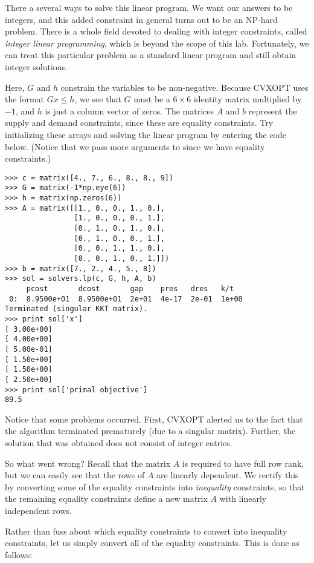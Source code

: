 There a several ways to solve this linear program. We want our answers to be integers, and this added constraint in general turns out to be an NP-hard problem.
There is a whole field devoted to dealing with integer constraints, called \emph{integer linear programming}, which is beyond the scope of this lab.
Fortunately, we can treat this particular problem as a standard linear program and still obtain integer solutions.

Here, $G$ and $h$ constrain the variables to be non-negative.
Because CVXOPT uses the format $Gx \leq h$, we see that $G$ must be a $6 \times 6$ identity matrix multiplied by $-1$, and
$h$ is just a column vector of zeros.
The matrices $A$ and $b$ represent the supply and demand constraints, since these are equality constraints.
Try initializing these arrays and solving the linear program by entering the code below. (Notice that
we pass more arguments to  since we have equality constraints.)
\begin{lstlisting}
>>> c = matrix([4., 7., 6., 8., 8., 9])
>>> G = matrix(-1*np.eye(6))
>>> h = matrix(np.zeros(6))
>>> A = matrix([[1., 0., 0., 1., 0.],
                [1., 0., 0., 0., 1.],
                [0., 1., 0., 1., 0.],
                [0., 1., 0., 0., 1.],
                [0., 0., 1., 1., 0.],
                [0., 0., 1., 0., 1.]])
>>> b = matrix([7., 2., 4., 5., 8])
>>> sol = solvers.lp(c, G, h, A, b)
     pcost       dcost       gap    pres   dres   k/t
 0:  8.9500e+01  8.9500e+01  2e+01  4e-17  2e-01  1e+00
Terminated (singular KKT matrix).
>>> print sol['x']
[ 3.00e+00]
[ 4.00e+00]
[ 5.00e-01]
[ 1.50e+00]
[ 1.50e+00]
[ 2.50e+00]
>>> print sol['primal objective']
89.5
\end{lstlisting}
Notice that some problems occurred. First, CVXOPT alerted us to the fact that the algorithm terminated prematurely (due to a singular matrix).
Further, the solution that was obtained does not consist of integer entries.

So what went wrong? Recall that the matrix $A$ is required to have full row rank, but we can easily see that the rows of $A$
are linearly dependent. We rectify this by converting some of the equality constraints into \emph{inequality} constraints, so that
the remaining equality constraints define a new matrix $A$ with linearly independent rows.

Rather than fuss about which equality
constraints to convert into inequality constraints, let us simply convert all of the equality constraints.
This is done as follows:

